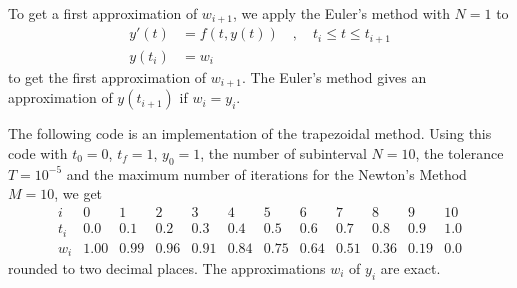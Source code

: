\begin{egg}
To get a first approximation of $w_{i+1}$, we apply the Euler's method
with $N=1$ to
\[
\begin{split}
y'(t) &= f(t,y(t)) \quad , \quad t_i \leq t \leq t_{i+1} \\
y(t_i) &= w_i
\end{split}
\]
to get the first approximation of $w_{i+1}$.  The Euler's method gives
an approximation of $y(t_{i+1})$ if $w_i = y_i$.

The following code is an implementation of the trapezoidal method.
Using this code with $t_0=0$, $t_f=1$, $y_0=1$, the
number of subinterval $N=10$, the tolerance $T=10^{-5}$ and the
maximum number of iterations for the Newton's Method $M=10$, we get
\[
\begin{array}{c|ccccccccccc}
i & 0 & 1 & 2 & 3 & 4 & 5 & 6 & 7 & 8 & 9 & 10 \\
\hline
t_i & 0.0 & 0.1 & 0.2 & 0.3 & 0.4 & 0.5 & 0.6 & 0.7 & 0.8 & 0.9
& 1.0\\
\hline
w_i & 1.00 & 0.99 & 0.96 & 0.91 & 0.84 & 0.75 & 0.64 & 0.51 & 0.36 & 0.19
& 0.0
\end{array}
\]
rounded to two decimal places.  The approximations $w_i$ of $y_i$ are exact.
\end{egg}

